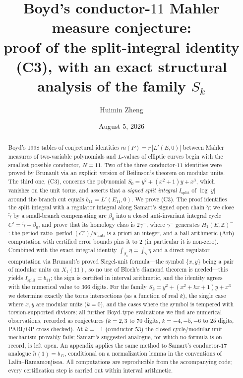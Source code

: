 \documentclass[11pt]{amsart}
\title[Boyd's conductor-$11$ conjecture]{Boyd's conductor-$11$ Mahler measure
conjecture:\\ proof of the split-integral identity \textup{(C3)},
with an exact structural analysis of the family $S_k$}
\author{Huimin Zheng}
\date{August 5, 2026}
\theoremstyle{definition}
\theoremstyle{remark}
\newcommand{\Z}{\mathbb{Z}}
\DeclareMathOperator{\period}{period}
\begin{document}
\begin{abstract}
Boyd's 1998 tables of conjectural identities $m(P)=r\,|L'(E,0)|$ between
Mahler measures of two-variable polynomials and $L$-values of elliptic curves
begin with the smallest possible conductor, $N=11$. Two of the three
conductor-$11$ identities were proved by Brunault via an explicit version of
Beilinson's theorem on modular units. The third one, (C3), concerns the
polynomial $S_0=y^2+(x^2+1)y+x^3$, which vanishes on the unit torus, and
asserts that a \emph{signed split integral} $I_{\mathrm{split}}$ of $\log|y|$
around the branch cut equals $b_{11}=L'(E_{11},0)$. We prove (C3). The proof
identifies the split integral with a regulator integral along Samart's signed
open chain $\tilde\gamma$; we close $\tilde\gamma$ by a small-branch
compensating arc $\beta_0$ into a closed anti-invariant integral cycle
$C'=\tilde\gamma+\beta_0$, and prove that its homology class is $2\gamma^-$,
where $\gamma^-$ generates $H_1(E,\Z)^-$: the period ratio
$\period(C')/w_{\mathrm{anti}}$ is a-priori an integer, and a
ball-arithmetic (Arb) computation with certified error bounds pins it to
$2$ (in particular it is non-zero). Combined with the exact integral identity
$\int_{\beta_0}\eta=\int_{\tilde\gamma}\eta$ and a direct regulator
computation via Brunault's proved Siegel-unit formula---the symbol
$\{x,y\}$ being a pair of modular units on $X_1(11)$, so no use of Bloch's
diamond theorem is needed---this yields $I_{\mathrm{split}}=b_{11}$; the sign is certified in interval
arithmetic, and the identity agrees with the numerical value to $366$
digits. For the family $S_k=y^2+(x^2+kx+1)y+x^3$ we determine exactly the
torus intersections (as a function of real $k$), the single case where
$x,y$ are modular units ($k=0$), and the cases where the symbol is
tempered with torsion-supported divisors; all further Boyd-type evaluations
we find are numerical
observations, recorded as conjectures ($k=2,3$ to $70$ digits, $k=-4,-5,-6$
to $25$ digits, PARI/GP cross-checked). At $k=-1$ (conductor $53$) the
closed-cycle/modular-unit mechanism provably fails; Samart's suggested
analogue, for which no formula is on record, is left open. An appendix
applies the same method to Samart's conductor-$17$ analogue
$\tilde n(1)=b_{17}$, conditional on a normalization lemma in the
conventions of Lal\'in--Ramamonjisoa. All computations are
reproducible from the accompanying
code; every certification step is carried out within
interval arithmetic.
\end{abstract}

\maketitle
\end{document}
